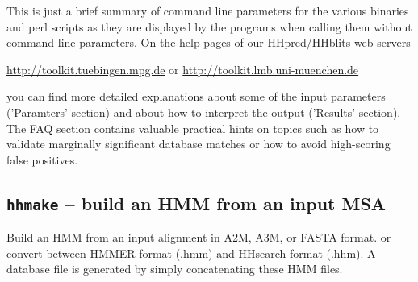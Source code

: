 \documentclass[11pt,a4paper]{article}
\begin{document}
This is just a brief summary of command line parameters for the various binaries and
perl scripts as they are displayed by the programs when calling them without 
command line parameters. On the help pages of our HHpred/HHblits web servers

\url{http://toolkit.tuebingen.mpg.de} or \url{http://toolkit.lmb.uni-muenchen.de}

you can find more detailed explanations about some of the input parameters 
('Paramters' section) and about how to interpret the output ('Results' section). The FAQ 
section contains valuable practical hints on topics such as how to validate marginally
significant database matches or how to avoid high-scoring false positives.

\subsection{{\tt hhmake} -- build an HMM from an input MSA}

Build an HMM from an input alignment in A2M, A3M, or FASTA format.   
or convert between HMMER format (.hmm) and HHsearch format (.hhm).   
A database file is generated by simply concatenating these HMM files.
\end{document}
